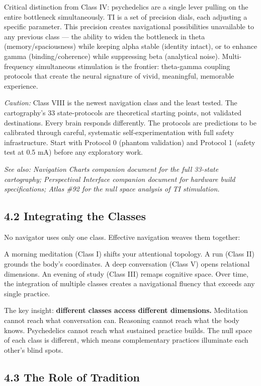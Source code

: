 Critical distinction from Class IV: psychedelics are a single lever pulling on the entire bottleneck simultaneously. TI is a set of precision dials, each adjusting a specific parameter. This precision creates navigational possibilities unavailable to any previous class — the ability to widen the bottleneck in theta (memory/spaciousness) while keeping alpha stable (identity intact), or to enhance gamma (binding/coherence) while suppressing beta (analytical noise). Multi-frequency simultaneous stimulation is the frontier: theta-gamma coupling protocols that create the neural signature of vivid, meaningful, memorable experience.


\textit{Caution:} Class VIII is the newest navigation class and the least tested. The cartography's 33 state-protocols are theoretical starting points, not validated destinations. Every brain responds differently. The protocols are predictions to be calibrated through careful, systematic self-experimentation with full safety infrastructure. Start with Protocol 0 (phantom validation) and Protocol 1 (safety test at 0.5 mA) before any exploratory work.


\textit{See also: Navigation Charts companion document for the full 33-state cartography; Perspectival Interface companion document for hardware build specifications; Atlas \#92 for the null space analysis of TI stimulation.}


\subsection*{4.2 Integrating the Classes}


No navigator uses only one class. Effective navigation weaves them together:


A morning meditation (Class I) shifts your attentional topology. A run (Class II) grounds the body's coordinates. A deep conversation (Class V) opens relational dimensions. An evening of study (Class III) remaps cognitive space. Over time, the integration of multiple classes creates a navigational fluency that exceeds any single practice.


The key insight: \textbf{different classes access different dimensions.} Meditation cannot reach what conversation can. Reasoning cannot reach what the body knows. Psychedelics cannot reach what sustained practice builds. The null space of each class is different, which means complementary practices illuminate each other's blind spots.


\subsection*{4.3 The Role of Tradition}


